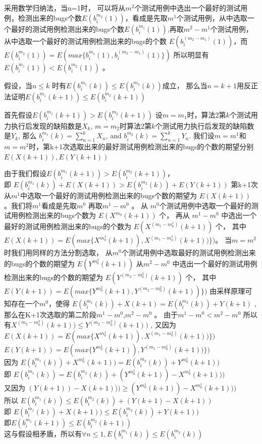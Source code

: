 \documentclass[10pt,journal,letterpaper,compsoc]{IEEEtran}
\begin{document}
\begin{CJK}{UTF8}{gkai}
采用数学归纳法，当n=1时，
可以将从$m^2$个测试用例中选出一个最好的测试用例，检测出来的bugs个数$E(b_i^{m_2}(1))$，看成是先取$m^1$个测试用例，从中选取一个最好的测试用例检测出来的bugs个数$E(b_i^{m_1}(1))$,再取$m^2-m^1$个测试用例，从中选取一个最好的测试用例检测出来的bugs的个数
$E(b_i^{(m_2-m_1)}(1))$，而$E(b_i^{m_2}(1))=E(max\{b_i^{m_1}(1),b_i^{(m_2-m_1)}(1)\})$
所以明显有$E(b_i^{m_1}(1)) < E(b_i^{m_2}(1))$ 。

假设，当$n\leq k$
时有$E(b_i^{m_1}(k)) \leq E(b_i^{m_2}(k))$成立，
那么当$n=k+1$用反正法证明$E(b_i^{m_1}(k+1)) \leq E(b_i^{m_2}(k+1))$

首先假设$E(b_i^{m_1}(k+1)) > E(b_i^{m_2}(k+1))$
设$m=m_1$时，算法2第$k$个测试用力执行后发现的缺陷数是$X_k$, $m=m_2$时算法2第$k$个测试用力执行后发现的缺陷数是$Y_k$, 那么
$b_i^{m_1}(k)=\sum_{n=1}^{k}X_n$, and $b_i^{m_2}(k)=\sum_{n=1}^{k}Y_n$.
我们设$m=m^1$和$m=m^2$时，第k+1次选取出来的最好测试用例检测出来的bugs的个数的期望分别
$E(X(k+1)),E(Y(k+1))$

由于我们假设$E(b_i^{m_1}(k+1)) > E(b_i^{m_2}(k+1))$，
\\即
$E(b_i^{m_1}(k))+E(X(k+1)) > E(b_i^{m_2}(k))+E(Y(k+1))$
第k+1次从$m^1$中选取一个最好的测试用例检测出来的bugs个数的期望为
$E(X(k+1))$ 。我们将$m^1$看成是先取$m^0$ 再取$ m^1-m^0 $ 。
从 $m^0$个测试用例中选取一个最好的测试用例检测出来的bugs个数为
$E(X^{m_0}(k+1))$ 个，
再从 $ m^1-m^0 $ 中选出一个最好的测试用例检测出来的bugs的个数为 
$E(X^{(m_1-m^1_0)}(k+1))$ 个，
其中 $E(X(k+1)) 
=E(max \{X^{m^1_0}(k+1)),X^{(m_1-m^1_0)}(k+1))\} )$。
当$m=m^2$时我们用同样的方法分割选取，
从$m^0$个测试用例中选取最好的测试用例检测出来的bugs的个数的期望为 
$E(Y^{m^2_0}(k+1))$
从$ m^2-m^0 $ 中选出一个最好的测试用例检测出来的bugs的个数的期望为 
$E(Y^{(m_2-m^2_0)}(k+1))$ 个，
其中
$E(Y(k+1))=E(max \{Y^{m^2_0}(k+1),Y^{(m_2-m^2_0)}(k+1))\})$ 
由采样原理可知存在一个$m^0$，使得
$E(b_i^{m_1}(k))+X(k+1) = E(b_i^{m_2}(k))+Y(k+1)$
,那么在K+1次选取的第二阶段$m^1-m^0$,$m^2-m^0$ 。
由于$m^1-m^0<m^2-m^0$
所以有$X^{(m_2-m^2_0)}(k+1)) \leq Y^{(m_2-m^2_0)}(k+1))$ ,
又因为
$E(X(k+1)) 
=E(max \{X^{m^1_0}(k+1)),X^{(m_1-m^1_0)}(k+1))\} )$
\\$E(Y(k+1)) 
=E(max \{Y^{m^1_0}(k+1)),Y^{(m_1-m^1_0)}(k+1))\} )$
\\因为
$E(b_i^{m_1}(k))+X^{m^1_0}(k+1)) = E(b_i^{m_2}(k))+Y^{m^1_0}(k+1))$
\\即
$E(b_i^{m_1}(k)) = E(b_i^{m_2}(k))+ (Y^{m^1_0}(k+1)) - X^{m^1_0}(k+1)))$
\\又因为 
$(Y(k+1)) - X(k+1)))
\geq (Y^{m^1_0}(k+1)) - X^{m^1_0}(k+1)))$
\\所以
$E(b_i^{m_1}(k)) 
\leq  E(b_i^{m_2}(k))+(Y(k+1) - X(k+1))$
\\即
$E(b_i^{m_1}(k))+ X(k+1)) \leq E(b_i^{m_2}(k))+Y(k+1))$
\\即$ E(b_i^{m_1}(k+1)) \leq E(b_i^{m_2}(k+1))$
\\这与假设相矛盾，所以有$\forall n \leq  1 ,E(b_i^{m_1}(k)) \leq E(b_i^{m_2}(k)) $


\end{CJK}
\end{document}
